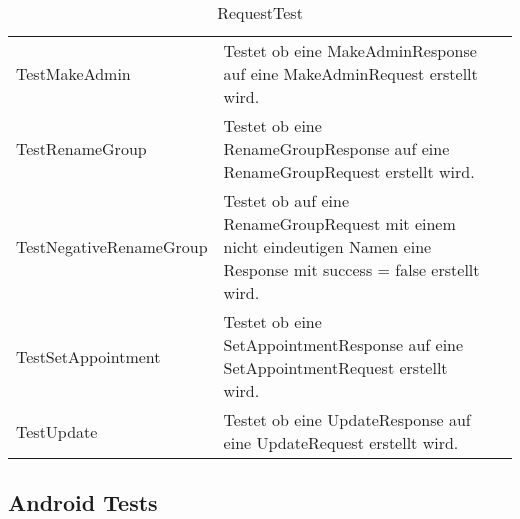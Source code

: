 \begin{table}[H]
{\begin{tabular}{|p{}|p{}|>{\centering}p{}|}
					\hspace{0pt}TestMakeAdmin & Testet ob eine MakeAdminResponse auf eine MakeAdminRequest erstellt wird. &	\checkmark\tabularnewline
					\hspace{0pt}TestRenameGroup & Testet ob eine RenameGroupResponse auf eine RenameGroupRequest erstellt wird. &	\checkmark\tabularnewline
					\hspace{0pt}TestNegativeRenameGroup & Testet ob auf eine RenameGroupRequest mit einem nicht eindeutigen Namen eine Response mit success = false erstellt wird. &	\checkmark\tabularnewline
					\hspace{0pt}TestSetAppointment & Testet ob eine SetAppointmentResponse auf eine SetAppointmentRequest erstellt wird. &	\checkmark\tabularnewline
					\hspace{0pt}TestUpdate & Testet ob eine UpdateResponse auf eine UpdateRequest erstellt wird. &	\checkmark\tabularnewline
				
					\hline
				\end{tabular}}
				\caption{RequestTest}
			\end{table}
			

\subsection{Android Tests}

